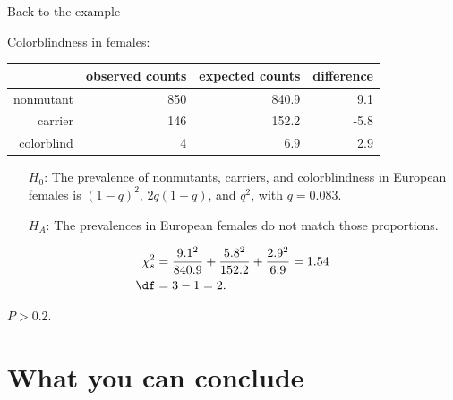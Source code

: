 \begin{frame}{Back to the example}

    Colorblindness in females:
    \begin{center}
        \begin{tabular}{r|rrr}
            & observed counts & expected counts & difference\\
            \hline 
            nonmutant & 850 & 840.9 & 9.1 \\ 
            carrier &  146 & 152.2 & -5.8 \\ 
            colorblind & 4 & 6.9 & 2.9  \\
        \end{tabular}
    \end{center}

    \vspace{2em}

    \begin{itemize}
      \item[$H_0$:] The prevalence of nonmutants, carriers, and colorblindness in European females is $(1-q)^2$, $2q(1-q)$, and $q^2$, with $q=0.083$.
      \item[$H_A$:] The prevalences in European females do not match those proportions.
    \end{itemize}

    \vspace{1em}

    \begin{align*}
        \chi^2_s &= \frac{9.1^2}{840.9} + \frac{5.8^2}{152.2} + \frac{2.9^2}{6.9} = 1.54 \\
        \df &= 3-1 = 2 .
      \end{align*}
      
      \vspace{1em}

      \alert{$P>0.2$.}

\end{frame}



\section{What you can conclude}



